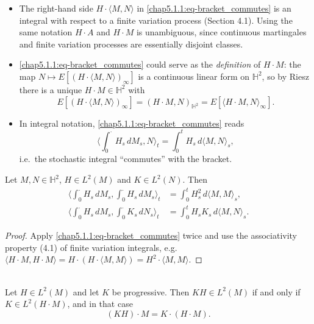 \begin{remark} \label{chap5.1.1:remark-notation_and_alt_definition}
\begin{itemize}
    \item The right-hand side $H \cdot \langle M,N\rangle$ in \eqref{chap5.1.1:eq-bracket_commutes} is an integral with respect to a finite variation process (Section 4.1). Using the same notation $H \cdot A$ and $H \cdot M$ is unambiguous, since continuous martingales and finite variation processes are essentially disjoint classes.
    \item \eqref{chap5.1.1:eq-bracket_commutes} could serve as the \textit{definition} of $H \cdot M$: the map $N \mapsto E[(H \cdot \langle M,N\rangle)_\infty]$ is a continuous linear form on $\mathbb{H}^2$, so by Riesz there is a unique $H \cdot M \in \mathbb{H}^2$ with
    $$E[(H \cdot \langle M,N\rangle)_\infty] = (H \cdot M, N)_{\mathbb{H}^2} = E[\langle H \cdot M, N\rangle_\infty].$$
    \item In integral notation, \eqref{chap5.1.1:eq-bracket_commutes} reads
    $$\Big\langle \int_0^\cdot H_s\, dM_s, N\Big\rangle_t = \int_0^t H_s \, d\langle M,N\rangle_s,$$
    i.e.\ the stochastic integral ``commutes'' with the bracket.
\end{itemize}
\end{remark}

\begin{corollary} \label{chap5.1.1:corollary-brackets}
Let $M, N \in \mathbb{H}^2$, $H \in L^2(M)$ and $K \in L^2(N)$. Then
\begin{align}
    \Big\langle \int_0^\cdot H_s\, dM_s, \int_0^\cdot H_s\, dM_s\Big\rangle_t &= \int_0^t H_s^2 \, d\langle M,M\rangle_s, \label{chap5.1.1:eq-QV_integral}\\
    \Big\langle \int_0^\cdot H_s\, dM_s, \int_0^\cdot K_s\, dN_s\Big\rangle_t &= \int_0^t H_s K_s \, d\langle M,N\rangle_s. \label{chap5.1.1:eq-covariation_integral}
\end{align}
\end{corollary}

\begin{proof}
Apply \eqref{chap5.1.1:eq-bracket_commutes} twice and use the associativity property (4.1) of finite variation integrals, e.g.\
$\langle H\cdot M, H \cdot M\rangle = H \cdot (H \cdot \langle M,M\rangle) = H^2 \cdot \langle M,M\rangle$.
\end{proof}

\begin{proposition}[Associativity] \label{chap5.1.1:proposition-associativity}
\LG{Proposition 5.5}\\
Let $H \in L^2(M)$ and let $K$ be progressive. Then $KH \in L^2(M)$ if and only if $K \in L^2(H \cdot M)$, and in that case
$$(KH) \cdot M = K \cdot (H \cdot M).$$
\end{proposition}

